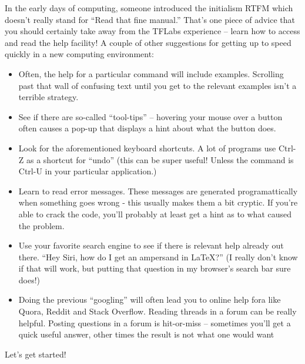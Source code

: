 In the early days of computing, someone introduced the initialism RTFM which doesn't really stand for ``Read that fine manual.''  That's one piece of advice that you should certainly take away from the TFLabs experience -- learn how to access and read the help facility!  A couple of other suggestions for getting up to speed quickly in a new computing environment:

\begin{itemize}
	\item Often, the help for a particular command will include examples.  Scrolling past that wall of confusing text until you get to the relevant examples isn't a terrible strategy.
	\item See if there are so-called ``tool-tips'' -- hovering your mouse over a button often causes a pop-up that displays a hint about what the button does.
	\item Look for the aforementioned keyboard shortcuts.  A lot of programs use Ctrl-Z as a shortcut for ``undo'' (this can be super useful!  Unless the command is Ctrl-U in your particular application.)
	\item Learn to read error messages.  These messages are generated programattically when something goes wrong - this usually makes them a bit cryptic.  If you're able to crack the code, you'll probably at least get a hint as to what caused the problem.
	\item Use your favorite search engine to see if there is relevant help already out there.  ``Hey Siri, how do I get an ampersand in LaTeX?''  (I really don't know if that will work, but putting that question in my browser's search bar sure does!)
	\item Doing the previous ``googling'' will often lead you to online help fora like Quora, Reddit and Stack Overflow.  Reading threads in a forum can be really helpful.  Posting questions in a forum is hit-or-miss -- sometimes you'll get a quick useful answer, other times the result is not what one would want\textellipsis  
\end{itemize}

Let's get started!

